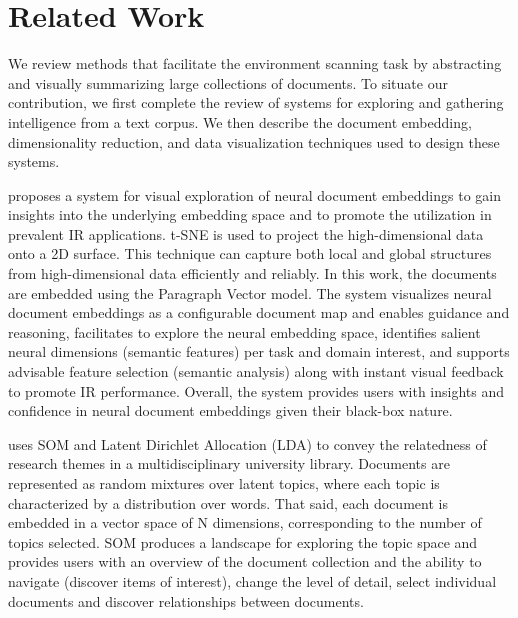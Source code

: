 \documentclass[a4paper]{article}
\begin{document}
\section*{Related Work}
We review methods that facilitate the environment scanning task by abstracting and visually summarizing large collections of documents. To situate our contribution, we first complete the review of systems for exploring and gathering intelligence from a text corpus. We then describe the document embedding, dimensionality reduction, and data visualization techniques used to design these systems. 

\citet{ji2019} proposes a system for visual exploration of neural document embeddings to gain insights into the underlying embedding space and to promote the utilization in prevalent IR applications. t-SNE is used to project the high-dimensional data onto a 2D surface. This technique can capture both local and global structures from high-dimensional data efficiently and reliably. In this work, the documents are embedded using the Paragraph Vector model. The system visualizes neural document embeddings as a configurable document map and enables guidance and reasoning, facilitates to explore the neural embedding space, identifies salient neural dimensions (semantic features) per task and domain interest, and supports advisable feature selection (semantic analysis) along with instant visual feedback to promote IR performance. Overall, the system provides users with insights and confidence in neural document embeddings given their black-box nature.

\citet{lafia2019} uses SOM and Latent Dirichlet Allocation (LDA) to convey the relatedness of research themes in a multidisciplinary university library. Documents are represented as random mixtures over latent topics, where each topic is characterized by a distribution over words. That said, each document is embedded in a vector space of N dimensions, corresponding to the number of topics selected. SOM produces a landscape for exploring the topic space and provides users with an overview of the document collection and the ability to navigate (discover items of interest), change the level of detail, select individual documents and discover relationships between documents.
\end{document}
